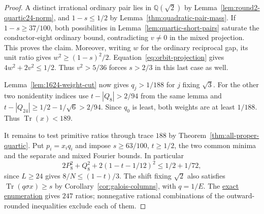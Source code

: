 \documentclass[11pt,reqno]{amsart}
\newcommand{\codecheck}[2]{\href{https://github.com/sebastienpalcoux/grothendieck-ring-classification/blob/d5750105bb5758f3ad38d2e5464dfcc12c019816/supplements/rank6/sphericality/#1}{#2}}
\theoremstyle{remark}\newtheorem{remark}[theorem]{Remark}
\numberwithin{equation}{section}
\begin{document}
\begin{proof}
A distinct irrational ordinary pair lies in $\mathbb Q(\sqrt2)$ by
Lemma~\ref{lem:round2-quartic24-norm}, and $1-s\le1/2$ by
Lemma~\ref{thm:quadratic-pair-mass}. If $1-s\ge37/100$, both possibilities in
Lemma~\ref{lem:quartic-short-pairs} saturate the conductor-eight
ordinary bound, contradicting $v\ne0$ in the mixed projection.
This proves the claim. Moreover, writing $w$ for the ordinary
reciprocal gap, its unit ratio gives $w^2\ge(1-s)^2/2$.
Equation~\eqref{eq:orbit-projection} gives $4w^2+2v^2\le1/2$.
Thus $v^2>5/36$ forces $s>2/3$ in this last case as well.

Lemma~\ref{lem:1624-weight-cut} now gives $q_j>1/188$ for $j$
fixing $\sqrt3$. For the other two nonidentity indices use
$t-|Q_8|>2/94$ from the same lemma
and $t-|Q_{24}|\ge1/2-1/\sqrt6>2/94$. Since $q_0$ is least,
both weights are at least $1/188$. Thus $\operatorname{Tr}(x)<189$.

It remains to test primitive ratios through trace $188$ by
Theorem~\ref{thm:all-proper-quartic}. Put $p_i=x_iq_i$ and impose
$s\ge63/100$, $t\ge1/2$, the two common minima and the separate and
mixed Fourier bounds. In particular
\[
 2P_8^2+Q_8^2+2(1-t-1/12)^2\le1/2+1/72,
\]
since $L\ge24$ gives $8/N\le(1-t)/3$. The shift fixing $\sqrt2$
also satisfies $\operatorname{Tr}(q\sigma x)\ge s$ by
Corollary~\ref{cor:galois-columns}, with $q=1/E$. The
\codecheck{generic_quartic/general24/verify.py}{exact enumeration}
gives $247$ ratios; nonnegative rational combinations of
the outward-rounded inequalities exclude each of them.
\end{proof}
\end{document}
